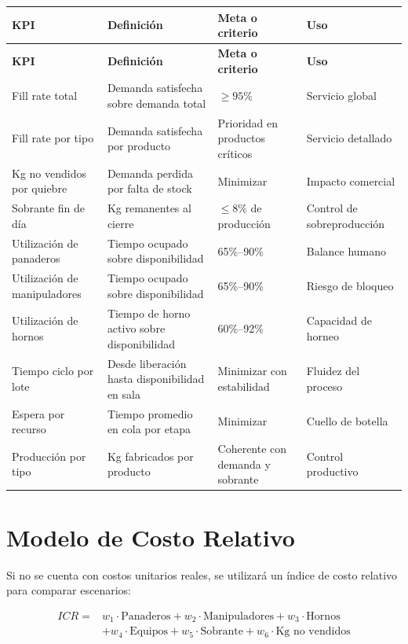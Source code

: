 \documentclass[11pt,letterpaper]{article}
\begin{document}
\begin{longtable}{L{4.1cm}L{5.2cm}L{3.2cm}L{2.6cm}}
  \toprule
  \textbf{KPI} & \textbf{Definición} & \textbf{Meta o criterio} & \textbf{Uso} \\
  \midrule
  \endfirsthead
  \toprule
  \textbf{KPI} & \textbf{Definición} & \textbf{Meta o criterio} & \textbf{Uso} \\
  \midrule
  \endhead
  Fill rate total & Demanda satisfecha sobre demanda total & \(\geq 95\%\) & Servicio global \\
  Fill rate por tipo & Demanda satisfecha por producto & Prioridad en productos críticos & Servicio detallado \\
  Kg no vendidos por quiebre & Demanda perdida por falta de stock & Minimizar & Impacto comercial \\
  Sobrante fin de día & Kg remanentes al cierre & \(\leq 8\%\) de producción & Control de sobreproducción \\
  Utilización de panaderos & Tiempo ocupado sobre disponibilidad & 65\%--90\% & Balance humano \\
  Utilización de manipuladores & Tiempo ocupado sobre disponibilidad & 65\%--90\% & Riesgo de bloqueo \\
  Utilización de hornos & Tiempo de horno activo sobre disponibilidad & 60\%--92\% & Capacidad de horneo \\
  Tiempo ciclo por lote & Desde liberación hasta disponibilidad en sala & Minimizar con estabilidad & Fluidez del proceso \\
  Espera por recurso & Tiempo promedio en cola por etapa & Minimizar & Cuello de botella \\
  Producción por tipo & Kg fabricados por producto & Coherente con demanda y sobrante & Control productivo \\
  \bottomrule
\end{longtable}

\section{Modelo de Costo Relativo}

Si no se cuenta con costos unitarios reales, se utilizará un índice de costo relativo para comparar escenarios:

\[
\begin{aligned}
ICR ={}& w_1 \cdot \text{Panaderos}
+ w_2 \cdot \text{Manipuladores}
+ w_3 \cdot \text{Hornos} \\
&+ w_4 \cdot \text{Equipos}
+ w_5 \cdot \text{Sobrante}
+ w_6 \cdot \text{Kg no vendidos}
\end{aligned}
\]
\end{document}
